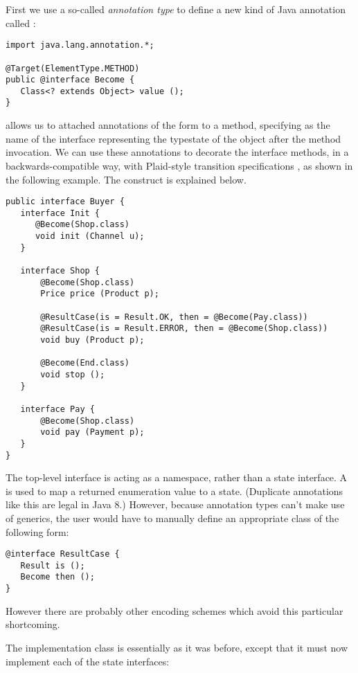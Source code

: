 First we use a so-called \emph{annotation type} to define a new kind
of Java annotation called :

\begin{lstlisting}
import java.lang.annotation.*;

@Target(ElementType.METHOD)
public @interface Become {
   Class<? extends Object> value ();
}
\end{lstlisting}

\noindent {} allows us to attached annotations of the form
 to a method, specifying  as the
name of the interface representing the typestate of the object after
the method invocation. We can use these annotations to decorate the
interface methods, in a backwards-compatible way, with Plaid-style
transition specifications \cite{garcia14}, as shown in the following
example. The  construct is explained below.

\begin{lstlisting}
public interface Buyer {
   interface Init {
      @Become(Shop.class)
      void init (Channel u);
   }

   interface Shop {
       @Become(Shop.class)
       Price price (Product p);

       @ResultCase(is = Result.OK, then = @Become(Pay.class))
       @ResultCase(is = Result.ERROR, then = @Become(Shop.class))
       void buy (Product p);

       @Become(End.class)
       void stop ();
   }

   interface Pay {
       @Become(Shop.class)
       void pay (Payment p);
   }
}
\end{lstlisting}

\noindent The top-level  interface is acting as a
namespace, rather than a state interface. A  is used
to map a returned enumeration value to a state. (Duplicate annotations
like this are legal in Java 8.) However, because annotation types
can't make use of generics, the user would have to manually define an
appropriate  class of the following form:
\begin{lstlisting}
@interface ResultCase {
   Result is ();
   Become then ();
}
\end{lstlisting}

\noindent However there are probably other encoding schemes which
avoid this particular shortcoming.

The implementation class  is essentially as it was
before, except that it must now implement each of the state
interfaces:

